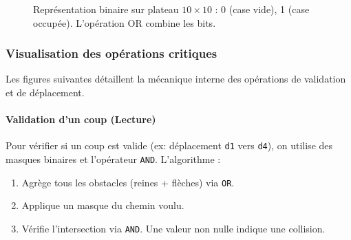 \documentclass[a4paper]{article}
\begin{document}
\begin{figure}[H]
\caption{Représentation binaire sur plateau $10 \times 10$ : 0 (case vide), 1 (case occupée). L'opération OR combine les bits.}
\label{fig:three_bitboards}
\end{figure}

\subsubsection{Visualisation des opérations critiques}

Les figures suivantes détaillent la mécanique interne des opérations de validation et de déplacement.

\paragraph{Validation d'un coup (Lecture)}

Pour vérifier si un coup est valide (ex: déplacement \texttt{d1} vers \texttt{d4}), on utilise des masques binaires et l'opérateur \texttt{AND}. L'algorithme :
\begin{enumerate}
    \item Agrège tous les obstacles (reines + flèches) via \texttt{OR}.
    \item Applique un masque du chemin voulu.
    \item Vérifie l'intersection via \texttt{AND}. Une valeur non nulle indique une collision.
\end{enumerate}
\end{document}
